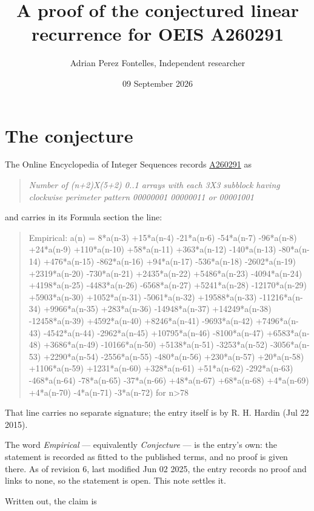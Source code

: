 \documentclass[11pt]{article}
\title{A proof of the conjectured linear recurrence for OEIS A260291}
\author{Adrian Perez Fontelles, Independent researcher}
\date{09 September 2026}
\theoremstyle{definition}
\begin{document}
\maketitle
\section{The conjecture}

The Online Encyclopedia of Integer Sequences records \href{https://oeis.org/A260291}{A260291} as

\begin{quote}\itshape Number of (n+2)X(5+2) 0..1 arrays with each 3X3 subblock having clockwise perimeter pattern 00000001 00000011 or 00001001\end{quote}

and carries in its Formula section the line:

\begin{quote}\ttfamily Empirical: a(n) = 8*a(n-3) +15*a(n-4) -21*a(n-6) -54*a(n-7) -96*a(n-8) +24*a(n-9) +110*a(n-10) +58*a(n-11) +363*a(n-12) -140*a(n-13) -80*a(n-14) +476*a(n-15) -862*a(n-16) +94*a(n-17) -536*a(n-18) -2602*a(n-19) +2319*a(n-20) -730*a(n-21) +2435*a(n-22) +5486*a(n-23) -4094*a(n-24) +4198*a(n-25) -4483*a(n-26) -6568*a(n-27) +5241*a(n-28) -12170*a(n-29) +5903*a(n-30) +1052*a(n-31) -5061*a(n-32) +19588*a(n-33) -11216*a(n-34) +9966*a(n-35) +283*a(n-36) -14948*a(n-37) +14249*a(n-38) -12458*a(n-39) +4592*a(n-40) +8246*a(n-41) -9693*a(n-42) +7496*a(n-43) -4542*a(n-44) -2962*a(n-45) +10795*a(n-46) -8100*a(n-47) +6583*a(n-48) +3686*a(n-49) -10166*a(n-50) +5138*a(n-51) -3253*a(n-52) -3056*a(n-53) +2290*a(n-54) -2556*a(n-55) -480*a(n-56) +230*a(n-57) +20*a(n-58) +1106*a(n-59) +1231*a(n-60) +328*a(n-61) +51*a(n-62) -292*a(n-63) -468*a(n-64) -78*a(n-65) -37*a(n-66) +48*a(n-67) +68*a(n-68) +4*a(n-69) +4*a(n-70) -4*a(n-71) -3*a(n-72) for n>78\end{quote}

That line carries no separate signature; the entry itself is by R. H. Hardin (Jul 22 2015).

The word {\itshape Empirical} --- equivalently {\itshape Conjecture} --- is the entry's own: the statement is recorded as fitted to the published terms, and no proof is given there. As of revision 6, last modified Jun 02 2025, the entry records no proof and links to none, so the statement is open. This note settles it.

Written out, the claim is
\end{document}
